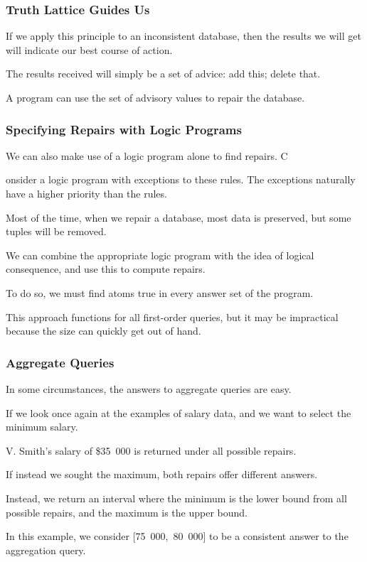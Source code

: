 \begin{frame}
\frametitle{Truth Lattice Guides Us}

If we apply this principle to an inconsistent database, then the results we will get will indicate our best course of action. 

The results received will simply be a set of advice: add this; delete that.

A program can use the set of advisory values to repair the database.


\end{frame}


\begin{frame}
\frametitle{Specifying Repairs with Logic Programs}

We can also make use of a logic program alone to find repairs. C

onsider a logic program with exceptions to these rules. The exceptions naturally have a higher priority than the rules. 

Most of the time, when we repair a database, most data is preserved, but some tuples will be removed. 

We can combine the appropriate logic program with the idea of logical consequence, and use this to compute repairs.

To do so, we must find atoms true in every answer set of the program. 

This approach functions for all first-order queries, but it may be impractical because the size can quickly get out of hand.

\end{frame}

\begin{frame}
\frametitle{Aggregate Queries}

In some circumstances, the answers to aggregate queries are easy. 

If we look once again at the examples of salary data, and we want to select the minimum salary. 

V. Smith's salary of \$35~000 is returned under all possible repairs. 

If instead we sought the maximum, both repairs offer different answers. 

Instead, we return an interval where the minimum is the lower bound from all possible repairs, and the maximum is the upper bound. 

In this example, we consider [75~000,~80~000] to be a consistent answer to the aggregation query.


\end{frame}

